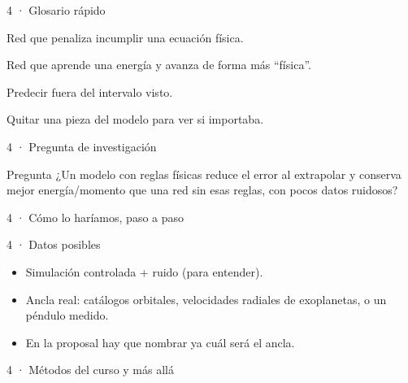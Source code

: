 \begin{frame}{4 · Glosario rápido}
  \begin{description}[font=\bfseries\scriptsize,style=nextline,leftmargin=1.6cm]
    \item[PINN] Red que penaliza incumplir una ecuación física.
    \item[HNN] Red que aprende una energía y avanza de forma más ``física''.
    \item[Extrapolación] Predecir fuera del intervalo visto.
    \item[Ablación] Quitar una pieza del modelo para ver si importaba.
  \end{description}
\end{frame}

\begin{frame}{4 · Pregunta de investigación}
  \begin{block}{Pregunta}
    ¿Un modelo con reglas físicas reduce el error al extrapolar y conserva mejor energía/momento que una red sin esas reglas, con pocos datos ruidosos?
  \end{block}
\end{frame}

\begin{frame}{4 · Cómo lo haríamos, paso a paso}
\end{frame}

\begin{frame}{4 · Datos posibles}
  \begin{itemize}
    \item Simulación controlada + ruido (para entender).
    \item Ancla real: catálogos orbitales, velocidades radiales de exoplanetas, o un péndulo medido.
    \item En la proposal hay que nombrar ya cuál será el ancla.
  \end{itemize}
\end{frame}

\begin{frame}{4 · Métodos del curso y más allá}
\end{frame}

